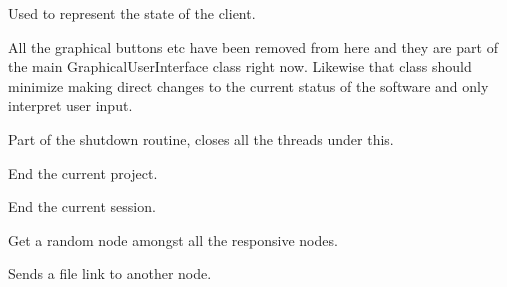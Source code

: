 \documentclass[letterpaper,10pt,english]{sphinxmanual}
\begin{document}
\begin{fulllineitems}
\label{state:state.State}
Used to represent the state of the client.

All the graphical buttons etc have been removed from here and
they are part of the main GraphicalUserInterface class right now.
Likewise that class should minimize making direct changes to the
current status of the software and only interpret user input.

\begin{fulllineitems}
\label{state:state.State.destroy}
Part of the shutdown routine, closes all the threads under this.

\end{fulllineitems}


\begin{fulllineitems}
\label{state:state.State.end_current_project}
End the current project.

\end{fulllineitems}


\begin{fulllineitems}
\label{state:state.State.end_current_session}
End the current session.

\end{fulllineitems}


\begin{fulllineitems}
\label{state:state.State.get_random_responsive}
Get a random node amongst all the responsive nodes.

\end{fulllineitems}


\begin{fulllineitems}
\label{state:state.State.handle_file_send}
Sends a file link to another node.


\end{fulllineitems}
\end{fulllineitems}
\end{document}
